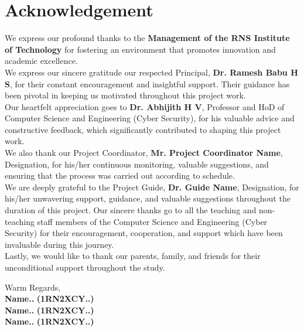 \chapter*{\centering Acknowledgement}%
%
\justifying
We express our profound thanks to the \textbf{Management of the RNS Institute of Technology} for fostering an environment that promotes innovation and academic excellence.\\
We express our sincere gratitude our respected Principal, \textbf{Dr. Ramesh Babu H S}, for their constant encouragement and insightful support. Their guidance has been pivotal in keeping us motivated throughout this project work.\\
Our heartfelt appreciation goes to \textbf{Dr. Abhijith H V}, Professor and HoD of Computer Science and Engineering (Cyber Security), for his valuable advice and constructive feedback, which significantly contributed to shaping this project work.\\
We also thank our Project Coordinator, \textbf{Mr. Project Coordinator Name}, Designation, for his/her continuous monitoring, valuable suggestions, and ensuring that the process was carried out according to schedule.\\
We are deeply grateful to the Project Guide, \textbf{Dr. Guide Name}, Designation, for his/her unwavering support, guidance, and valuable suggestions throughout the duration of this project.
Our sincere thanks go to all the teaching and non-teaching staff members of the Computer Science and Engineering (Cyber Security) for their encouragement, cooperation, and support which have been invaluable during this journey.\\
Lastly, we would like to thank our parents, family, and friends for their unconditional support throughout the study.

\begin{flushleft}
Warm Regards,\\
 \textbf{Name..}
 \textbf{(1RN2XCY..)}\\
 \textbf{Name..}
 \textbf{(1RN2XCY..)}\\
 \textbf{Name..}
 \textbf{(1RN2XCY..)}\\
\end{flushleft}
\thispagestyle{plain}